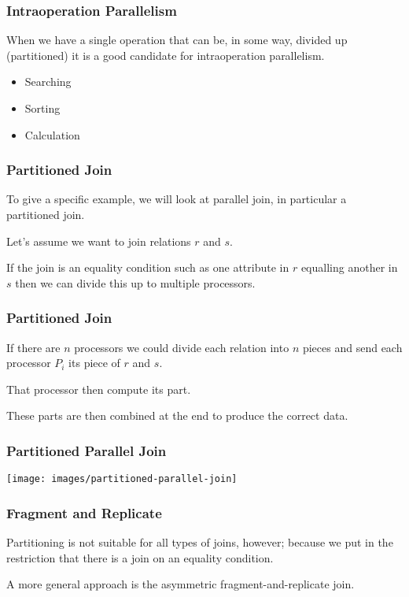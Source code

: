 \begin{frame}
\frametitle{Intraoperation Parallelism}

When we have a single operation that can be, in some way, divided up (partitioned) it is a good candidate for intraoperation parallelism. 

\begin{itemize}
	\item Searching
	\item Sorting
	\item Calculation
\end{itemize}

\end{frame}

\begin{frame}
\frametitle{Partitioned Join}

To give a specific example, we will look at parallel join, in particular a partitioned join. 

Let's assume we want to join relations $r$ and $s$. 

If the join is an equality condition such as one attribute in $r$ equalling another in $s$ then we can divide this up to multiple processors.

\end{frame}

\begin{frame}
\frametitle{Partitioned Join}
If there are $n$ processors we could divide each relation into $n$ pieces and send each processor $P_{i}$ its piece of $r$ and $s$. 

That processor then compute its part. 

These parts are then combined at the end to produce the correct data. 


\end{frame}

\begin{frame}
\frametitle{Partitioned Parallel Join}

\begin{center}
\texttt{[image: images/partitioned-parallel-join]}
\end{center}

\end{frame}

\begin{frame}
\frametitle{Fragment and Replicate}

Partitioning is not suitable for all types of joins, however; because we put in the restriction that there is a join on an equality condition. 

A more general approach is the \alert{asymmetric fragment-and-replicate join}.

\end{frame}

